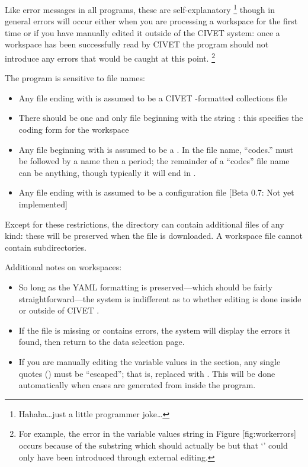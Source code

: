\documentclass[letterpaper,10pt,english]{sphinxmanual}
\begin{document}
Like error messages in all programs, these are self-explanatory \footnote{
Hahaha…just a little programmer joke…
}
though in general errors will occur either when you are processing a
workspace for the first time or if you have manually edited it outside
of the CIVET system: once a workspace has been successfully read by
CIVET the program should not introduce any errors that would be caught
at this point. \footnote{
For example, the error in the variable values string in Figure
{[}fig:workerrors{]} occurs because of the substring
 which should actually be
 but that ‘\code{=}’ could only have been
introduced through external editing.
}

The program is sensitive to file names:
\begin{itemize}
\item {} 
Any file ending with  is assumed to be a CIVET -formatted
collections file

\item {} 
There should be one and only file beginning with the string
: this specifies the coding form for the workspace

\item {} 
Any file beginning with  is assumed to be a
{\hyperref[workspaces:sec-categories]{\emph{}}}. In the file name,
``codes.'' must be followed by a
 name then a period; the remainder of a ``codes'' file
name can be anything, though typically it will end in .

\item {} 
Any file ending with  is assumed to be a configuration file
{[}Beta 0.7: Not yet implemented{]}

\end{itemize}

Except for these restrictions, the directory can contain additional
files of any kind: these will be preserved when the file is downloaded.
A workspace file cannot contain subdirectories.

Additional notes on workspaces:
\begin{itemize}
\item {} 
So long as the YAML formatting is preserved—which should be fairly
straightforward—the system is indifferent as to whether editing is
done inside or outside of CIVET .

\item {} 
If the  file is missing or contains errors, the system will
display the errors it found, then return to the data selection page.

\item {} 
If you are manually editing the variable values in the 
section, any single quotes () must be “escaped”; that is,
replaced with . This will be done automatically when cases are
generated from inside the program.

\end{itemize}
\end{document}

